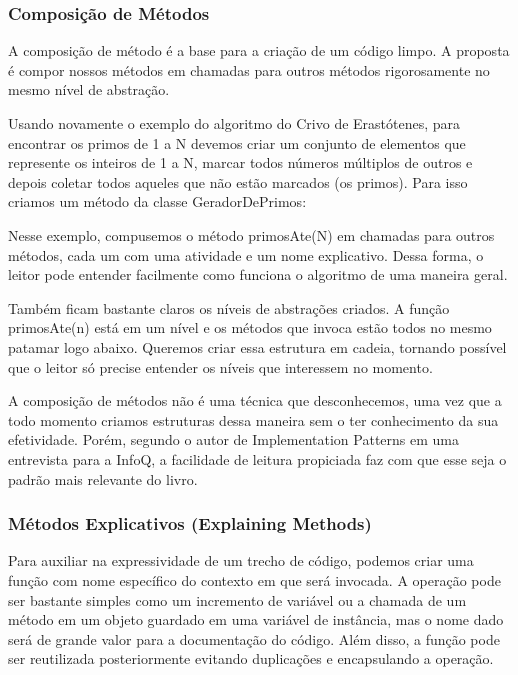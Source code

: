 \subsubsection{Composição de Métodos}
A composição de método é a base para a criação de um código limpo. A proposta é compor nossos métodos em chamadas para outros métodos rigorosamente no mesmo nível de abstração.
	
Usando novamente o exemplo do algoritmo do Crivo de Erastótenes, para encontrar os primos de 1 a N devemos criar um conjunto de elementos que represente os inteiros de 1 a N, marcar todos números múltiplos de outros e depois coletar todos aqueles que não estão marcados (os primos). Para isso criamos um método da classe GeradorDePrimos:



Nesse exemplo, compusemos o método primosAte(N) em chamadas para outros métodos, cada um com uma atividade e um nome explicativo. Dessa forma, o leitor pode entender facilmente como funciona o algoritmo de uma maneira geral. 
	
Também ficam bastante claros os níveis de abstrações criados. A função primosAte(n) está em um nível e os métodos que invoca estão todos no mesmo patamar logo abaixo. Queremos criar essa estrutura em cadeia, tornando possível que o leitor só precise entender os níveis que interessem no momento.
	
A composição de métodos não é uma técnica que desconhecemos, uma vez que a todo momento criamos estruturas dessa maneira sem o ter conhecimento da sua efetividade. Porém, segundo o autor de Implementation Patterns em uma entrevista para a InfoQ, a facilidade de leitura propiciada faz com que esse seja o padrão mais relevante do livro. 	

\subsubsection{Métodos Explicativos (Explaining Methods)}
Para auxiliar na expressividade de um trecho de código, podemos criar uma função com nome específico do contexto em que será invocada. A operação pode ser bastante simples como um incremento de variável ou a chamada de um método em um objeto guardado em uma variável de instância, mas o nome dado será de grande valor para a documentação do código. Além disso, a função pode ser reutilizada posteriormente evitando duplicações e encapsulando a operação.
	
